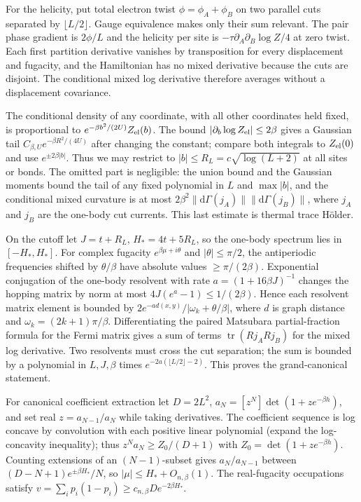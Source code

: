\documentclass[11pt]{article}
\DeclareMathOperator{\tr}{tr}
\begin{document}
For the helicity, put total electron twist $\phi=\phi_A+\phi_B$ on two parallel cuts separated by $\lfloor L/2\rfloor$. Gauge equivalence makes only their sum relevant. The pair phase gradient is $2\phi/L$ and the helicity per site is $-\tau\partial_A\partial_B\log Z/4$ at zero twist. Each first partition derivative vanishes by transposition for every displacement and fugacity, and the Hamiltonian has no mixed derivative because the cuts are disjoint. The conditional mixed log derivative therefore averages without a displacement covariance.

The conditional density of any coordinate, with all other coordinates held fixed, is proportional to $e^{-\beta b^2/(2U)}Z_{\rm el}(b)$. The bound $|\partial_b\log Z_{\rm el}|\le2\beta$ gives a Gaussian tail $C_{\beta,U}e^{-\beta R^2/(4U)}$ after changing the constant; compare both integrals to $Z_{\rm el}(0)$ and use $e^{\pm2\beta|b|}$. Thus we may restrict to $|b|\le R_L=c\sqrt{\log(L+2)}$ at all sites or bonds. The omitted part is negligible: the union bound and the Gaussian moments bound the tail of any fixed polynomial in $L$ and $\max |b|$, and the conditional mixed curvature is at most $2\beta^2\|\mathrm d\Gamma(j_A)\|\|\mathrm d\Gamma(j_B)\|$, where $j_A$ and $j_B$ are the one-body cut currents. This last estimate is thermal trace H\"older.

On the cutoff let $J=t+R_L$, $H_*=4t+5R_L$, so the one-body spectrum lies in $[-H_*,H_*]$. For complex fugacity $e^{\beta\mu+i\theta}$ and $|\theta|\le\pi/2$, the antiperiodic frequencies shifted by $\theta/\beta$ have absolute values $\ge\pi/(2\beta)$. Exponential conjugation of the one-body resolvent with rate $a=(1+16\beta J)^{-1}$ changes the hopping matrix by norm at most $4J(e^a-1)\le 1/(2\beta)$. Hence each resolvent matrix element is bounded by $2e^{-a d(x,y)}/|\omega_k+\theta/\beta|$, where $d$ is graph distance and $\omega_k=(2k+1)\pi/\beta$. Differentiating the paired Matsubara partial-fraction formula for the Fermi matrix gives a sum of terms $\tr(R j_A R j_B)$ for the mixed log derivative. Two resolvents must cross the cut separation; the sum is bounded by a polynomial in $L,J,\beta$ times $e^{-2a(\lfloor L/2\rfloor-2)}$. This proves the grand-canonical statement.

For canonical coefficient extraction let $D=2L^2$, $a_N=[z^N]\det(1+z e^{-\beta h})$, and set real $z=a_{N-1}/a_N$ while taking derivatives. The coefficient sequence is log concave by convolution with each positive linear polynomial (expand the log-concavity inequality); thus $z^N a_N\ge Z_0/(D+1)$ with $Z_0=\det(1+z e^{-\beta h})$. Counting extensions of an $(N-1)$-subset gives $a_N/a_{N-1}$ between $(D-N+1)e^{\pm\beta H_*}/N$, so $|\mu|\le H_*+O_{n,\beta}(1)$. The real-fugacity occupations satisfy $v=\sum_i p_i(1-p_i)\ge c_{n,\beta}D e^{-2\beta H_*}$.
\end{document}
